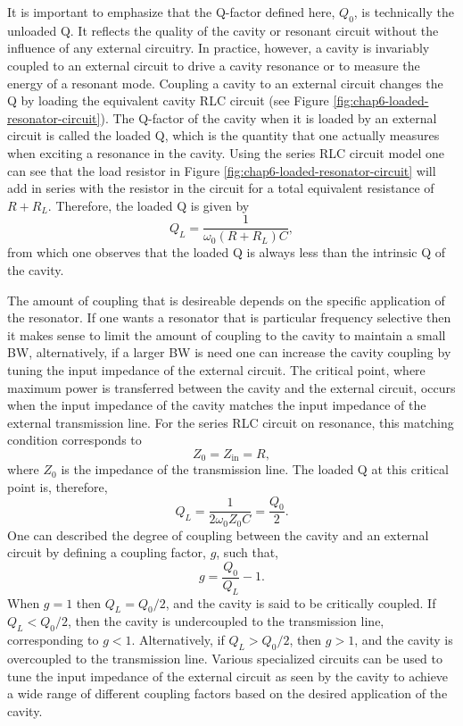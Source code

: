 It is important to emphasize that the Q-factor defined here, $Q_0$, is technically the unloaded Q. It reflects the quality of the cavity or resonant circuit without the influence of any external circuitry. In practice, however, a cavity is invariably coupled to an external circuit to drive a cavity resonance or to measure the energy of a resonant mode. Coupling a cavity to an external circuit changes the Q by loading the equivalent cavity RLC circuit (see Figure \ref{fig:chap6-loaded-resonator-circuit}). The Q-factor of the cavity when it is loaded by an external circuit is called the loaded Q, which is the quantity that one actually measures when exciting a resonance in the cavity. Using the series RLC circuit model one can see that the load resistor in Figure \ref{fig:chap6-loaded-resonator-circuit} will add in series with the resistor in the circuit for a total equivalent resistance of $R+R_L$. Therefore, the loaded Q is given by 
\begin{equation}
    Q_L=\frac{1}{\omega_0(R+R_L)C},
\end{equation}
from which one observes that the loaded Q is always less than the intrinsic Q of the cavity.

The amount of coupling that is desireable depends on the specific application of the resonator. If one wants a resonator that is particular frequency selective then it makes sense to limit the amount of coupling to the cavity to maintain a small BW, alternatively, if a larger BW is need one can increase the cavity coupling by tuning the input impedance of the external circuit. The critical point, where maximum power is transferred between the cavity and the external circuit, occurs when the input impedance of the cavity matches the input impedance of the external transmission line.  For the series RLC circuit on resonance, this matching condition corresponds to 
\begin{equation}
    Z_0=Z_\mathrm{in}=R,
\end{equation}
where $Z_0$ is the impedance of the transmission line. The loaded Q at this critical point is, therefore,
\begin{equation}
    Q_L=\frac{1}{2\omega_0Z_0C}=\frac{Q_0}{2}.
\end{equation}
One can described the degree of coupling between the cavity and an external circuit by defining a coupling factor, $g$, such that,
\begin{equation}
    g=\frac{Q_0}{Q_L}-1.
    \label{eq:chap6-coupling-factor}
\end{equation} 
When $g=1$ then $Q_L=Q_0/2$, and the cavity is said to be critically coupled. If $Q_L<Q_0/2$, then the cavity is undercoupled to the transmission line, corresponding to $g<1$. Alternatively, if $Q_L>Q_0/2$, then $g>1$, and the cavity is overcoupled to the transmission line. Various specialized circuits can be used to tune the input impedance of the external circuit as seen by the cavity to achieve a wide range of different coupling factors based on the desired application of the cavity.

